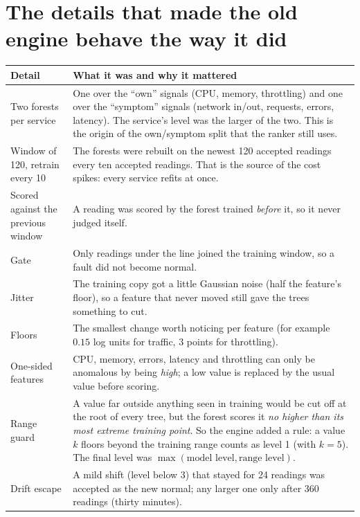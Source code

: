 \section{The details that made the old engine behave the way it did}
\begin{center}
\small
\begin{tabularx}{\textwidth}{>{\raggedright\arraybackslash}p{3.7cm}>{\raggedright\arraybackslash}X}
\toprule
\textbf{Detail} & \textbf{What it was and why it mattered}\\
\midrule
Two forests per service & One over the ``own'' signals (CPU, memory, throttling) and one over the ``symptom'' signals (network in/out, requests, errors, latency). The service's level was the larger of the two. This is the origin of the own/symptom split that the ranker still uses.\\
Window of 120, retrain every 10 & The forests were rebuilt on the newest 120 accepted readings every ten accepted readings. That is the source of the cost spikes: every service refits at once.\\
Scored against the previous window & A reading was scored by the forest trained \emph{before} it, so it never judged itself.\\
Gate & Only readings under the line joined the training window, so a fault did not become normal.\\
Jitter & The training copy got a little Gaussian noise (half the feature's floor), so a feature that never moved still gave the trees something to cut.\\
Floors & The smallest change worth noticing per feature (for example $0.15$ log units for traffic, $3$ points for throttling).\\
One-sided features & CPU, memory, errors, latency and throttling can only be anomalous by being \emph{high}; a low value is replaced by the usual value before scoring.\\
Range guard & A value far outside anything seen in training would be cut off at the root of every tree, but the forest scores it \emph{no higher than its most extreme training point}. So the engine added a rule: a value $k$ floors beyond the training range counts as level 1 (with $k=5$). The final level was $\max(\text{model level},\text{range level})$.\\
Drift escape & A mild shift (level below 3) that stayed for 24 readings was accepted as the new normal; any larger one only after 360 readings (thirty minutes).\\
\bottomrule
\end{tabularx}
\end{center}


